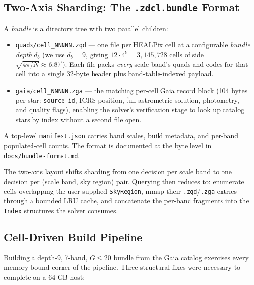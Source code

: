 \documentclass[twocolumn, 10pt]{article}
\newcommand{\arcmin}{\ensuremath{^{\prime}}}
\begin{document}
\subsection{Two-Axis Sharding: The \texttt{.zdcl.bundle} Format} \label{sec:bundle-format}

A \emph{bundle} is a directory tree with two parallel children:

\begin{itemize}
  \item \texttt{quads/cell\_NNNNN.zqd} --- one file per HEALPix cell at
    a configurable \emph{bundle depth} $d_b$ (we use $d_b = 9$, giving
    $12 \cdot 4^9 = 3{,}145{,}728$ cells of side $\sqrt{4\pi/N} \approx
    6.87\arcmin$). Each file packs \emph{every} scale band's quads and
    codes for that cell into a single 32-byte header plus
    band-table-indexed payload.
  \item \texttt{gaia/cell\_NNNNN.zga} --- the matching per-cell Gaia
    record block (104 bytes per star: \texttt{source\_id}, ICRS
    position, full astrometric solution, photometry, and quality
    flags), enabling the solver's verification stage to look up
    catalog stars by index without a second file open.
\end{itemize}

A top-level \texttt{manifest.json} carries band scales, build metadata,
and per-band populated-cell counts. The format is documented at the
byte level in \texttt{docs/bundle-format.md}.

The two-axis layout shifts sharding from one decision per scale band
to one decision per (scale band, sky region) pair. Querying then
reduces to: enumerate cells overlapping the user-supplied
\texttt{SkyRegion}, mmap their \texttt{.zqd}/\texttt{.zga} entries
through a bounded LRU cache, and concatenate the per-band fragments
into the \texttt{Index} structures the solver consumes.

\subsection{Cell-Driven Build Pipeline} \label{sec:cell-build}

Building a depth-9, 7-band, $G \le 20$ bundle from the Gaia catalog
exercises every memory-bound corner of the pipeline. Three structural
fixes were necessary to complete on a 64-GB host:
\end{document}
